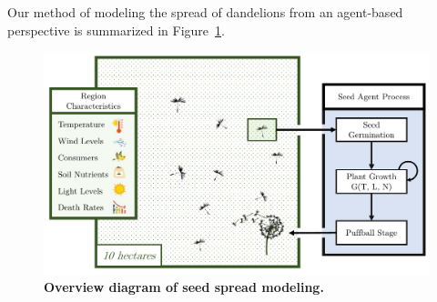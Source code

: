 Our method of modeling the spread of dandelions from an agent-based perspective is summarized in Figure~\ref{fig:partadiagram}.

\begin{figure}[h!]
\centering
    \includegraphics[scale=0.8]{figures/seedspreadprocess2.pdf}
    \captionsetup{width=0.9\textwidth}
    \caption{\textbf{Overview diagram of seed spread modeling.} }
    \label{fig:partadiagram}
\end{figure}